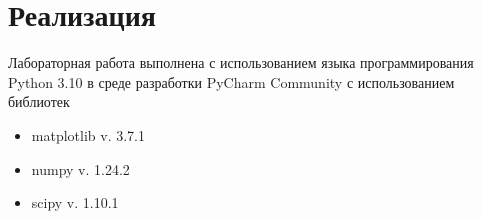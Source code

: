 \section{Реализация}
Лабораторная работа выполнена с использованием языка программирования Python 3.10 в среде разработки PyCharm Community с использованием библиотек

\begin{itemize}
	\item matplotlib v. 3.7.1
	\item numpy v. 1.24.2
	\item scipy v. 1.10.1
\end{itemize}

\newpage
